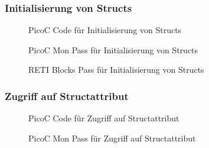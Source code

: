 \subsubsection{Initialisierung von Structs}
\begin{figure}[H]
  \centering
  \caption{PicoC Code für Initialisierung von Structs}
  \label{fig:picoc_code_für_initialisierung_von_structs}
\end{figure}

{
  \centering
  \label{fig:abstract_syntax_tree_für_initialisierung_von_structs}
}

\begin{figure}[H]
  \centering
  \caption{PicoC Mon Pass für Initialisierung von Structs}
  \label{fig:picoc_mon_pass_für_initialisierung_von_structs}
\end{figure}

\begin{figure}[H]
  \centering
  \caption{RETI Blocks Pass für Initialisierung von Structs}
  \label{fig:reti_blocks_pass_für_initialisierung_von_structs}
\end{figure}

\subsubsection{Zugriff auf Structattribut}
\begin{figure}[H]
  \centering
  \caption{PicoC Code für Zugriff auf Structattribut}
  \label{fig:picoc_code_für_zugriff_auf_structattribut}
\end{figure}

{
  \centering
  \label{fig:abstract_syntax_tree_für_zugriff_auf_structattribut}
}

\begin{figure}[H]
  \centering
  \caption{PicoC Mon Pass für Zugriff auf Structattribut}
  \label{fig:picoc_mon_pass_für_zugriff_auf_structattribut}
\end{figure}

